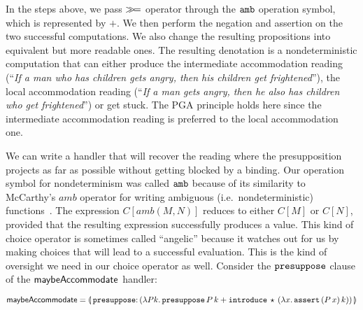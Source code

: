 
In the steps above, we pass $\mathbin{\gg\!=}$ operator through the $\mathtt{amb}$
operation symbol, which is represented by $+$. We then perform the negation
and assertion on the two successful computations. We also change the
resulting propositions into equivalent but more readable ones. The
resulting denotation is a nondeterministic computation that can either
produce the intermediate accommodation reading (``\emph{If a man who has
  children gets angry, then his children get frightened}''), the local
accommodation reading (``\emph{If a man gets angry, then he also has
  children who get frightened}'') or get stuck. The PGA principle holds
here since the intermediate accommodation reading is preferred to the local
accommodation one.

We can write a handler that will recover the reading where the
presupposition projects as far as possible without getting blocked by a
binding. Our operation symbol for nondeterminism was called $\mathtt{amb}$
because of its similarity to McCarthy's $amb$ operator for writing
ambiguous (i.e.\ nondeterministic)
functions~\cite{mccarthy1961basis,abelson1996structure}. The expression
$C[amb(M, N)]$ reduces to either $C[M]$ or $C[N]$, provided that the
resulting expression successfully produces a value. This kind of choice
operator is sometimes called ``angelic'' because it watches out for us by
making choices that will lead to a successful evaluation. This is the kind
of oversight we need in our choice operator as well. Consider the
$\mathtt{presuppose}$ clause of the $\textsf{maybeAccommodate}$ handler:

$$
  \maybeAccommodate = \banana{\onto{\op{presuppose}}{(\lam{P k}{
    \app{\op{presuppose}}{P}{k} +
    \app{\op{introduce}}{\star}{(\lam{x}{\app{\op{assert}}{(\ap{P}{x})}{k}})}})}}
$$

